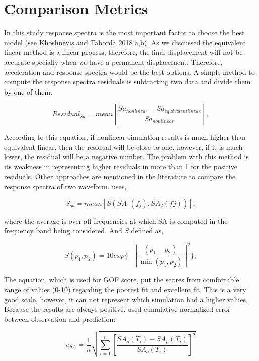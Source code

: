 \section{Comparison Metrics}

In this study response spectra is the most important factor to choose the best model (see Khoshnevis and Taborda 2018 a,b). As we discussed the equivalent linear method is a linear process, therefore, the final displacement will not be accurate specially when we have a permanent displacement. Therefore, acceleration and response spectra would be the best options. A simple method to compute the response spectra residuals is subtracting two data and divide them by one of them. 


\begin{equation}
Residual_{Sa} = mean[\frac{Sa_{nonlinear} - Sa_{equivalent linear}}{Sa_{nonlinear}}],
\end{equation}

According to this equation, if nonlinear simulation results is much higher than equivalent linear, then the residual will be close to one, however, if it is much lower, the residual will be a negative number. The problem with this method is its weakness in representing higher residuals in more than 1 for the positive residuals.  Other approaches are mentioned in the literature to compare the response spectra of two waveform. \citet{Anderson_2004_Proc} uses,

\begin{equation}
S_{sa} = mean[S(SA_1(f_j),SA_2(fj))],
\end{equation}

where the average is over all frequencies at which SA is computed in the frequency band being considered. And $S $ defined as,

\begin{equation}
	S( p_1, p_2) = 10 exp \{ - [ \frac{(p_1 - p_2)}{ \min( p_1, p_2 ) }]^2 \},
\end{equation}

The equation, which is used for GOF score, put the scores from comfortable range of values (0-10) regarding the poorest fit and excellent fit. This is a very good scale, however, it can not represent which simulation had a higher values. Because the results are always positive.  \citet{Assimaki2008quantifying} used cumulative normalized error between observation and prediction:

\begin{equation}
e_{SA}=\frac{1}{n}\sqrt{\sum_{i=1}^{n}[\frac{SA_o(T_i)-SA_p(T_i)}{SA_o(T_i)}]^2}
\end{equation}

